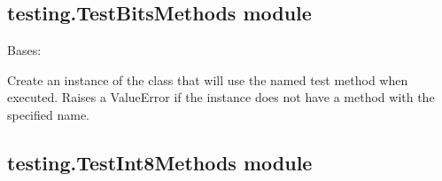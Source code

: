 \documentclass[letterpaper,10pt,english]{sphinxmanual}
\begin{document}
\subsection{testing.TestBitsMethods module}
\label{testing:testing-testbitsmethods-module}\label{testing:module-testing.TestBitsMethods}

\begin{fulllineitems}
\label{testing:testing.TestBitsMethods.TestBitsMethods}
Bases: 

Create an instance of the class that will use the named test
method when executed. Raises a ValueError if the instance does
not have a method with the specified name.

\begin{fulllineitems}
\label{testing:testing.TestBitsMethods.TestBitsMethods.test_and}
\end{fulllineitems}


\begin{fulllineitems}
\label{testing:testing.TestBitsMethods.TestBitsMethods.test_or}
\end{fulllineitems}


\begin{fulllineitems}
\label{testing:testing.TestBitsMethods.TestBitsMethods.test_xor}
\end{fulllineitems}


\end{fulllineitems}



\subsection{testing.TestInt8Methods module}
\label{testing:testing-testint8methods-module}\label{testing:module-testing.TestInt8Methods}
\end{document}
